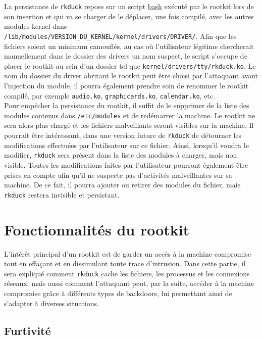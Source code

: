 \documentclass[12pt]{article}
\begin{document}
    La persistance de \texttt{rkduck} repose sur un script \href{https://github.com/QuokkaLight/rkduck/blob/master/forever.sh}{bash} exécuté par le rootkit lors de son insertion et qui va se charger de le déplacer, une fois compilé, avec les autres modules kernel dans \texttt{/lib/modules/VERSION\_DU\_KERNEL/kernel/drivers/DRIVER/}. Afin que les fichiers soient un minimum camouflés, au cas où l'utilisateur légitime chercherait manuellement dans le dossier des drivers un nom suspect, le script s'occupe de placer le rootkit au sein d'un dossier tel que \texttt{kernel/drivers/tty/rkduck.ko}. Le nom du dossier du driver abritant le rootkit peut être choisi par l'attaquant avant l'injection du module, il pourra également prendre soin de renommer le rootkit compilé, par exemple \texttt{audio.ko}, \texttt{graphicards.ko}, \texttt{calendar.ko}, etc. \\

    Pour empêcher la persistance du rootkit, il suffit de le supprimer de la liste des modules contenus dans \texttt{/etc/modules} et de redémarrer la machine. Le rootkit ne sera alors plus chargé et les fichiers malveillants seront visibles sur la machine. Il pourrait être intéressant, dans une version future de \texttt{rkduck} de détourner les modifications effectuées par l'utilisateur sur ce fichier. Ainsi, lorsqu'il voudra le modifier, \texttt{rkduck} sera présent dans la liste des modules à charger, mais non visible. Toutes les modifications faites par l'utilisateur pourront également être prises en compte afin qu'il ne suspecte pas d'activités malveillantes sur sa machine. De ce fait, il pourra ajouter ou retirer des modules du fichier, mais \texttt{rkduck} restera invisible et persistant.

\section{Fonctionnalités du rootkit}
    
    L'intérêt principal d'un rootkit est de garder un accès à la machine compromise tout en effaçant et en dissimulant toute trace d'intrusion. Dans cette partie, il sera expliqué comment \texttt{rkduck} cache les fichiers, les processus et les connexions réseaux, mais aussi comment l'attaquant peut, par la suite, accéder à la machine compromise grâce à différents types de backdoors, lui permettant ainsi de s'adapter à diverses situations.

    \subsection{Furtivité}
        
\end{document}
